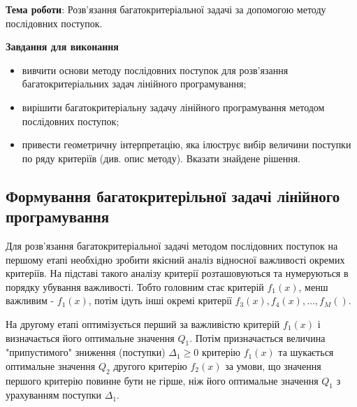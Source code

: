 


\newcommand{\labnumber}{4} %



\usepackage{systeme}
\usepackage{longtable,tabu}
\usepackage{multirow}
\usepackage{array,multirow}
\usepackage{pdflscape}
\usepackage{afterpage}
\usepackage{bm}

\graphicspath{{../figures/}}


\Ukrainian


\addtocounter{page}{1}

\textbf{Тема роботи}: Розв'язання багатокритеріальної задачі за допомогою методу послідовних поступок.

\textbf{Завдання для виконання}
\begin{itemize}
	\item вивчити основи методу послідовних поступок для розв'язання багатокритеріальних задач лінійного програмування;
	\item вирішити багатокритеріальну задачу лінійного програмування методом послідовних поступок;
	\item привести геометричну інтерпретацію, яка ілюструє вибір величини поступки по ряду критеріїв (див. опис методу). 
	Вказати знайдене рішення.
\end{itemize}



\subsection{Формування багатокритерільної задачі лінійного програмування}
Для розв'язання багатокритеріальної задачі методом послідовних поступок на першому етапі необхідно зробити якісний аналіз відносної важливості окремих критеріїв.
На підставі такого аналізу критерії розташовуються та нумеруються в порядку убування важливості. 
Тобто головним стає критерій $f_1(x)$, менш важливим - $f_1(x)$, потім ідуть інші окремі критерії $f_3(x), f_4(x), \dotsc, f_M()$.

На другому етапі оптимізується перший за важливістю критерій $f_1(x)$ і визначається його оптимальне значення $Q_1$. 
Потім призначається величина "припустимого" зниження (поступки) $\Delta_1 \geq 0$ критерію $f_1(x)$ та шукається оптимальне значення $Q_2$ другого критерію $f_2(x)$ за умови, що значення першого критерію повинне бути не гірше, ніж його оптимальне значення $Q_1$ з урахуванням поступки $\Delta_1$.

